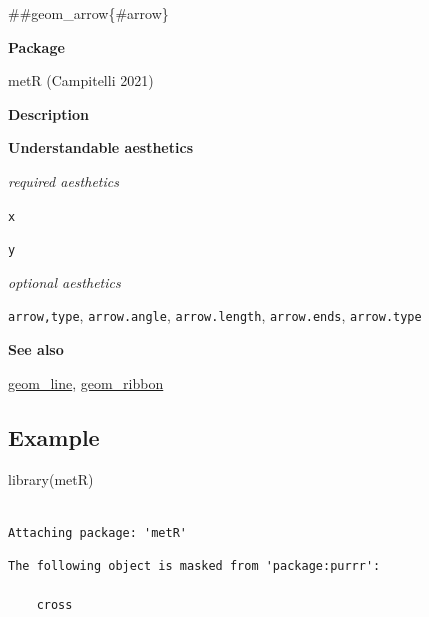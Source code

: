 \documentclass[
  letterpaper,
  DIV=11,
  numbers=noendperiod]{scrreprt}
\newenvironment{Shaded}{\begin{snugshade}}{\end{snugshade}}
\newcommand{\FunctionTok}[1]{\textcolor[rgb]{0.28,0.35,0.67}{#1}}
\newcommand{\NormalTok}[1]{\textcolor[rgb]{0.00,0.23,0.31}{#1}}
\begin{document}
\#\#geom\_arrow\{\#arrow\}

\textbf{Package}

metR (Campitelli 2021)

\textbf{Description}

\textbf{Understandable aesthetics}

\emph{required aesthetics}

\texttt{x}

\texttt{y}

\emph{optional aesthetics}

\texttt{arrow,type}, \texttt{arrow.angle}, \texttt{arrow.length},
\texttt{arrow.ends}, \texttt{arrow.type}

\textbf{See also}

\hyperref[line]{geom\_line}, \hyperref[ribbon]{geom\_ribbon}

\subsection{Example}\label{example}

\begin{Shaded}
\begin{Highlighting}[]
\FunctionTok{library}\NormalTok{(metR)}
\end{Highlighting}
\end{Shaded}

\begin{verbatim}

Attaching package: 'metR'
\end{verbatim}

\begin{verbatim}
The following object is masked from 'package:purrr':

    cross
\end{verbatim}
\end{document}
